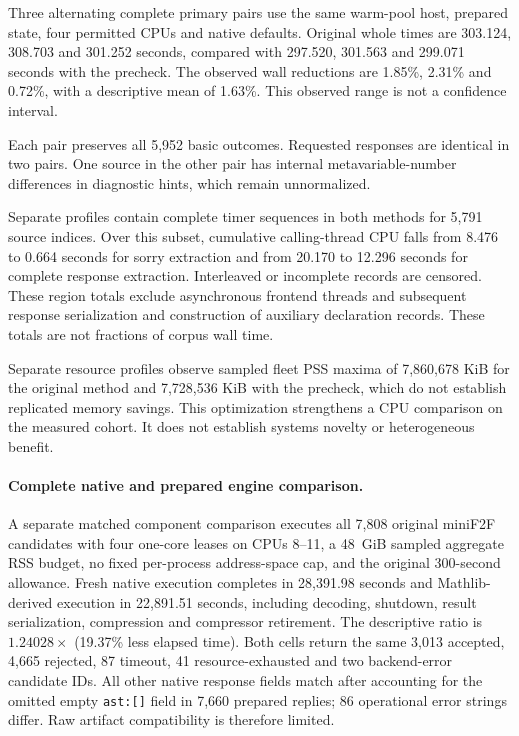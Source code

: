 \documentclass[10pt,twocolumn]{article}
\begin{document}
Three alternating complete primary pairs use the same warm-pool host,
prepared state, four permitted CPUs and native defaults.
Original whole times are 303.124, 308.703 and 301.252 seconds, compared with
297.520, 301.563 and 299.071 seconds with the precheck.
The observed wall reductions are 1.85\%, 2.31\% and 0.72\%, with a descriptive
mean of 1.63\%. This observed range is not a confidence interval.

Each pair preserves all 5,952 basic outcomes. Requested responses are identical
in two pairs. One source in the other pair has internal metavariable-number
differences in diagnostic hints, which remain unnormalized.

Separate profiles contain complete timer sequences in both methods for
5,791 source indices. Over this subset, cumulative calling-thread CPU falls from 8.476 to 0.664 seconds for sorry extraction
and from 20.170 to 12.296 seconds for complete response extraction. Interleaved or incomplete records are censored.
These region totals exclude asynchronous frontend threads and subsequent
response serialization and construction of auxiliary declaration records. These totals are not
fractions of corpus wall time.

Separate resource profiles observe sampled fleet PSS maxima of 7,860,678 KiB
for the original method and 7,728,536 KiB with the precheck, which do not
establish replicated memory savings. This optimization strengthens a CPU
comparison on the measured cohort. It does not establish systems novelty
or heterogeneous benefit.

\paragraph{Complete native and prepared engine comparison.}
A separate matched component comparison executes all 7,808 original miniF2F
candidates with four one-core leases on CPUs 8--11, a 48~GiB sampled aggregate
RSS budget, no fixed per-process address-space cap, and the original
300-second allowance. Fresh native execution completes in 28,391.98 seconds
and Mathlib-derived execution in 22,891.51 seconds, including decoding,
shutdown, result serialization, compression and compressor retirement.
The descriptive ratio is $1.24028\times$ (19.37\% less elapsed time).
Both cells return the same 3,013 accepted, 4,665 rejected, 87 timeout,
41 resource-exhausted and two backend-error candidate IDs.
All other native response fields match after accounting for the omitted empty
\texttt{ast:[]} field in 7,660 prepared replies; 86 operational error strings
differ. Raw artifact compatibility is therefore limited.
\end{document}
